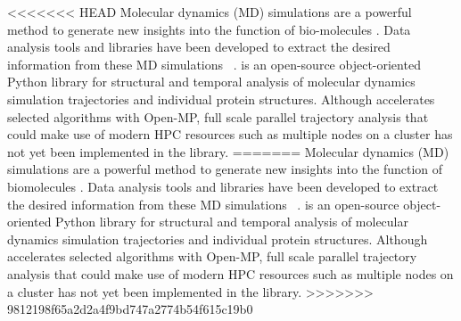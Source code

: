 \label{sec:introduction}
<<<<<<< HEAD
Molecular dynamics (MD) simulations are a powerful method to generate new insights into the function of bio-molecules \cite{QwikMD2016}.
Data analysis tools and libraries have been developed to extract the desired information from these MD simulations ~\cite{Gowers:2016aa,Michaud-Agrawal:2011fu,cpptraj-2013,himach-2008,mdtraj-2015,Mura:2010mw}. 
 \citep{Gowers:2016aa,Michaud-Agrawal:2011fu} is an open-source object-oriented Python library for structural and temporal analysis of molecular dynamics simulation trajectories and individual protein structures. 
Although  accelerates selected algorithms with Open-MP, full scale parallel trajectory analysis that could make use of modern HPC resources such as multiple nodes on a cluster has not yet been implemented in the library. 
=======
Molecular dynamics (MD) simulations are a powerful method to generate new insights into the function of biomolecules \citep{Borhani:2012mi, Dror:2012cr, Orozco:2014dq, Perilla:2015kx, Bottaro:2018aa}.  Data analysis tools and libraries have been developed to extract the desired information from these MD simulations ~\cite{nmoldyn, nmoldyn-2012, Hum96, Hinsen:2000kx, Grant:2006ud, himach-2008, Romo:2009zr, Romo:2014bh, Michaud-Agrawal:2011fu, Gowers:2016aa, cpptraj-2013, mdtraj-2015, pteros2015, Doerr:2016aa}.    \citep{Gowers:2016aa,Michaud-Agrawal:2011fu} is an open-source object-oriented Python library for structural and temporal analysis of molecular dynamics simulation trajectories and individual protein structures.  Although  accelerates selected algorithms with Open-MP, full scale parallel trajectory analysis that could make use of modern HPC resources such as multiple nodes on a cluster has not yet been implemented in the library.
>>>>>>> 9812198f65a2d2a4f9bd747a2774b54f615c19b0

